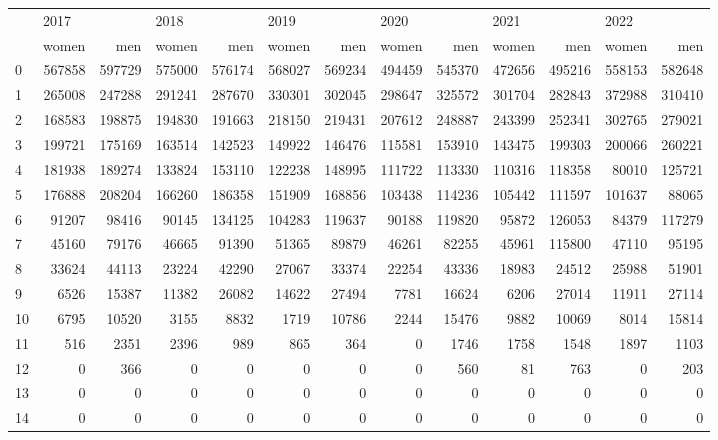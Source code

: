 \begin{tabular}{lrrrrrrrrrrrr}
\toprule
{} & \multicolumn{2}{l}{2017} & \multicolumn{2}{l}{2018} & \multicolumn{2}{l}{2019} & \multicolumn{2}{l}{2020} & \multicolumn{2}{l}{2021} & \multicolumn{2}{l}{2022} \\
{} &   women &     men &   women &     men &   women &     men &   women &     men &   women &     men &   women &     men \\
\midrule
0  &  567858 &  597729 &  575000 &  576174 &  568027 &  569234 &  494459 &  545370 &  472656 &  495216 &  558153 &  582648 \\
1  &  265008 &  247288 &  291241 &  287670 &  330301 &  302045 &  298647 &  325572 &  301704 &  282843 &  372988 &  310410 \\
2  &  168583 &  198875 &  194830 &  191663 &  218150 &  219431 &  207612 &  248887 &  243399 &  252341 &  302765 &  279021 \\
3  &  199721 &  175169 &  163514 &  142523 &  149922 &  146476 &  115581 &  153910 &  143475 &  199303 &  200066 &  260221 \\
4  &  181938 &  189274 &  133824 &  153110 &  122238 &  148995 &  111722 &  113330 &  110316 &  118358 &   80010 &  125721 \\
5  &  176888 &  208204 &  166260 &  186358 &  151909 &  168856 &  103438 &  114236 &  105442 &  111597 &  101637 &   88065 \\
6  &   91207 &   98416 &   90145 &  134125 &  104283 &  119637 &   90188 &  119820 &   95872 &  126053 &   84379 &  117279 \\
7  &   45160 &   79176 &   46665 &   91390 &   51365 &   89879 &   46261 &   82255 &   45961 &  115800 &   47110 &   95195 \\
8  &   33624 &   44113 &   23224 &   42290 &   27067 &   33374 &   22254 &   43336 &   18983 &   24512 &   25988 &   51901 \\
9  &    6526 &   15387 &   11382 &   26082 &   14622 &   27494 &    7781 &   16624 &    6206 &   27014 &   11911 &   27114 \\
10 &    6795 &   10520 &    3155 &    8832 &    1719 &   10786 &    2244 &   15476 &    9882 &   10069 &    8014 &   15814 \\
11 &     516 &    2351 &    2396 &     989 &     865 &     364 &       0 &    1746 &    1758 &    1548 &    1897 &    1103 \\
12 &       0 &     366 &       0 &       0 &       0 &       0 &       0 &     560 &      81 &     763 &       0 &     203 \\
13 &       0 &       0 &       0 &       0 &       0 &       0 &       0 &       0 &       0 &       0 &       0 &       0 \\
14 &       0 &       0 &       0 &       0 &       0 &       0 &       0 &       0 &       0 &       0 &       0 &       0 \\
\bottomrule
\end{tabular}
